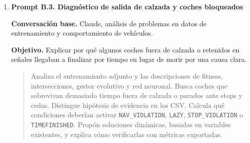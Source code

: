 {\begin{enumerate}[leftmargin=*,itemsep=0.2\baselineskip,topsep=2pt,parsep=0pt,partopsep=0pt]
  \textbf{Objetivo.} Evitar que el entrenamiento premie coches que sobreviven sin avanzar, retroceden o permanecen inmóviles sin una causa de tráfico válida.

  \promptDepurado
  \begin{quote}
  \small
  Revisa la lógica de fitness y detección de muerte para vehículos que retroceden o se quedan parados. Necesito diferenciar una parada legítima, por semáforo, stop, ceda u obstáculo delante, de una parada que solo alarga la vida del coche sin aportar recorrido útil. Propón una lógica basada en velocidad real, contexto de tráfico, sensores frontales y tiempo de vida. No uses números fijos sin justificación. Indica qué razón de muerte o métrica de diagnóstico debe registrarse para validar el cambio.
  \end{quote}

  \textbf{Respuesta aprovechada.} Se aprovechó la separación conceptual entre parada justificada y comportamiento perezoso, además de la necesidad de penalizar el retroceso con una causa trazable.

  \textbf{Comprobación realizada.} Se comprobó con los informes de entrenamiento, las razones de muerte \texttt{LAZY}, \texttt{BACKWARDS} y \texttt{TIMEFINISHED}, y los casos de coches vivos sin progreso.

  \textbf{Uso final en el proyecto.} El capítulo 5 describe la penalización por marcha atrás, estancamiento y navegación no válida, y el capítulo 6 advierte que el tiempo de vida no puede usarse como único indicador.

  \item \textbf{Prompt B.3. Diagnóstico de salida de calzada y coches bloqueados}

  \textbf{Conversación base.} Claude, análisis de problemas en datos de entrenamiento y comportamiento de vehículos.

  \textbf{Objetivo.} Explicar por qué algunos coches fuera de calzada o retenidos en señales llegaban a finalizar por tiempo en lugar de morir por una causa clara.

  \promptDepurado
  \begin{quote}
  \small
  Analiza el entrenamiento adjunto y las descripciones de fitness, intersecciones, gestor evolutivo y red neuronal. Busca coches que sobrevivan demasiado tiempo fuera de calzada o parados ante stops y cedas. Distingue hipótesis de evidencia en los CSV. Calcula qué condiciones deberían activar \texttt{NAV\_VIOLATION}, \texttt{LAZY}, \texttt{STOP\_VIOLATION} o \texttt{TIMEFINISHED}. Propón soluciones dinámicas, basadas en variables existentes, y explica cómo verificarlas con métricas exportadas.
  \end{quote}


\end{enumerate}}

